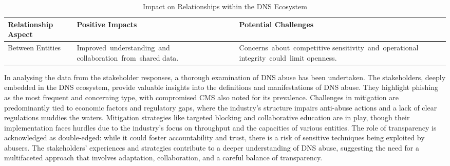 {

\begin{table}[H]
\centering
\footnotesize 
\begin{tabular}{|l|p{4cm}|p{4cm}|}
\hline
\textbf{Relationship Aspect} & \textbf{Positive Impacts} & \textbf{Potential Challenges} \\
\hline
Between Entities & \mbox {Improved understanding and} \mbox {collaboration from shared} data. & \mbox {Concerns about competitive} \mbox {sensitivity and operational} \mbox {integrity could limit} openness. \\
\hline
\end{tabular}
\caption{Impact on Relationships within the DNS Ecosystem}
\label{table:impact_on_relationships}
\end{table}
}

In analysing the data from the stakeholder responses, a thorough examination of DNS abuse has been undertaken. The stakeholders, deeply embedded in the DNS ecosystem, provide valuable insights into the definitions and manifestations of DNS abuse. They highlight phishing as the most frequent and concerning type, with compromised CMS also noted for its prevalence. Challenges in mitigation are predominantly tied to economic factors and regulatory gaps, where the industry's structure impairs anti-abuse actions and a lack of clear regulations muddies the waters. Mitigation strategies like targeted blocking and collaborative education are in play, though their implementation faces hurdles due to the industry's focus on throughput and the capacities of various entities. The role of transparency is acknowledged as double-edged: while it could foster accountability and trust, there is a risk of sensitive techniques being exploited by abusers. The stakeholders' experiences and strategies contribute to a deeper understanding of DNS abuse, suggesting the need for a multifaceted approach that involves adaptation, collaboration, and a careful balance of transparency.


